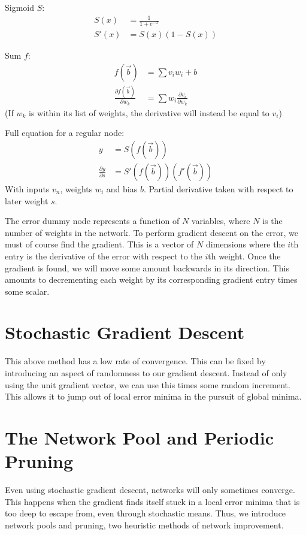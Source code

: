 \documentclass[8pt]{amsart}
\begin{document}
Sigmoid $S$:
$$
\begin{aligned}
    S(x) &= \frac{1}{1 + e^{-x}} \\
    S'(x) &= S(x) (1 - S(x))
\end{aligned}
$$

Sum $f$:
$$
\begin{aligned}
    f(\vec{b}) &= \sum{v_i w_i} + b \\
    \frac{\partial f(\vec{b})}{\partial w_k} &= \sum{w_i \frac{\partial v_i}{\partial w_k}}
\end{aligned}
$$
(If $w_k$ is within its list of weights, the derivative will instead be equal to $v_i$)

Full equation for a regular node:
$$
\begin{aligned}
    y &= S(f(\vec{b})) \\
    \frac{\partial y}{\partial s} &= S'(f(\vec{b}))(f'(\vec{b}))
\end{aligned}
$$
With inputs $v_n$, weights $w_i$ and bias $b$.
Partial derivative taken with respect to later weight $s$.

The error dummy node represents a function of $N$ variables, where $N$ is the
number of weights in the network. To perform gradient descent on the error, we
must of course find the gradient. This is a vector of $N$ dimensions where the
$i$th entry is the derivative of the error with respect to the $i$th weight.
Once the gradient is found, we will move some amount backwards in its direction.
This amounts to decrementing each weight by its corresponding gradient entry
times some scalar.

\section{Stochastic Gradient Descent}

This above method has a low rate of convergence. This can be fixed by
introducing an aspect of randomness to our gradient descent. Instead of only
using the unit gradient vector, we can use this times some random increment. This
allows it to jump out of local error minima in the pursuit of global minima.

\section{The Network Pool and Periodic Pruning}

Even using stochastic gradient descent, networks will only sometimes converge.
This happens when the gradient finds itself stuck in a local error minima that is
too deep to escape from, even through stochastic means. Thus, we introduce
network pools and pruning, two heuristic methods of network improvement.
\end{document}
